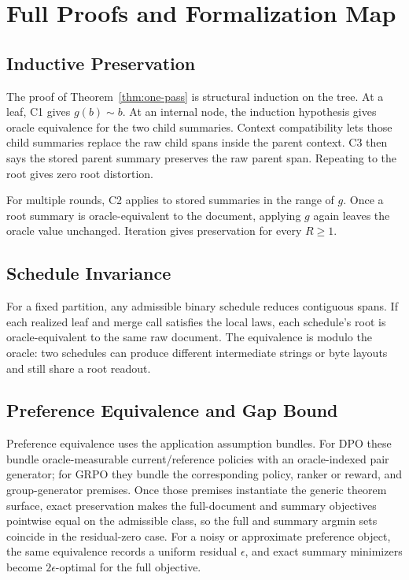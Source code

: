 \section{Full Proofs and Formalization Map}\label{app:min-proofs}

\subsection{Inductive Preservation}

The proof of Theorem~\ref{thm:one-pass} is structural induction on the tree.
At a leaf, C1 gives $g(b)\sim b$. At an internal node, the induction
hypothesis gives oracle equivalence for the two child summaries. Context
compatibility lets those child summaries replace the raw child spans inside
the parent context. C3 then says the stored parent summary preserves the raw
parent span. Repeating to the root gives zero root distortion.

For multiple rounds, C2 applies to stored summaries in the range of $g$. Once a
root summary is oracle-equivalent to the document, applying $g$ again leaves
the oracle value unchanged. Iteration gives preservation for every $R\ge 1$.

\subsection{Schedule Invariance}

For a fixed partition, any admissible binary schedule reduces contiguous
spans. If each realized leaf and merge call satisfies the local laws, each
schedule's root is oracle-equivalent to the same raw document. The
equivalence is modulo the oracle: two schedules can produce different
intermediate strings or byte layouts and still share a root readout.

\subsection{Preference Equivalence and Gap Bound}

Preference equivalence uses the application assumption bundles. For DPO these
bundle oracle-measurable current/reference policies with an oracle-indexed pair
generator; for GRPO they bundle the corresponding policy, ranker or reward, and
group-generator premises. Once those premises instantiate the generic theorem
surface, exact preservation makes the full-document and summary objectives
pointwise equal on the admissible class, so the full and summary argmin sets
coincide in the residual-zero case. For a noisy or approximate preference
object, the same equivalence records a uniform residual $\epsilon$, and exact
summary minimizers become $2\epsilon$-optimal for the full objective.


